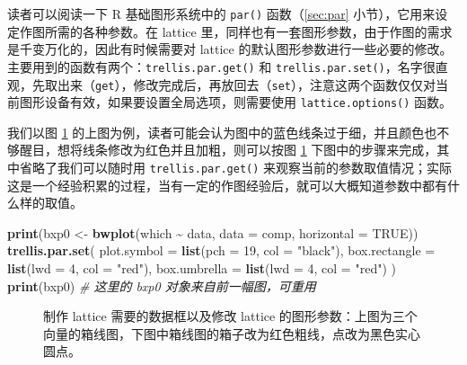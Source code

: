 \documentclass[
  b5paper,
  UTF8,twoside]{book}
\newenvironment{Shaded}{\begin{snugshade}}{\end{snugshade}}
\newcommand{\AttributeTok}[1]{\textcolor[rgb]{0.13,0.29,0.53}{#1}}
\newcommand{\CommentTok}[1]{\textcolor[rgb]{0.56,0.35,0.01}{\textit{#1}}}
\newcommand{\ConstantTok}[1]{\textcolor[rgb]{0.56,0.35,0.01}{#1}}
\newcommand{\DecValTok}[1]{\textcolor[rgb]{0.00,0.00,0.81}{#1}}
\newcommand{\FunctionTok}[1]{\textcolor[rgb]{0.13,0.29,0.53}{\textbf{#1}}}
\newcommand{\NormalTok}[1]{#1}
\newcommand{\OtherTok}[1]{\textcolor[rgb]{0.56,0.35,0.01}{#1}}
\newcommand{\SpecialCharTok}[1]{\textcolor[rgb]{0.81,0.36,0.00}{\textbf{#1}}}
\newcommand{\StringTok}[1]{\textcolor[rgb]{0.31,0.60,0.02}{#1}}
\begin{document}
读者可以阅读一下 R 基础图形系统中的 \texttt{par()} 函数（\ref{sec:par} 小节），它用来设定作图所需的各种参数。在 lattice 里，同样也有一套图形参数，由于作图的需求是千变万化的，因此有时候需要对 lattice 的默认图形参数进行一些必要的修改。主要用到的函数有两个：\texttt{trellis.par.get()} 和 \texttt{trellis.par.set()}，名字很直观，先取出来（\texttt{get}），修改完成后，再放回去（\texttt{set}），注意这两个函数仅仅对当前图形设备有效，如果要设置全局选项，则需要使用 \texttt{lattice.options()} 函数。

我们以图 \ref{fig:lattice-data-par} 的上图为例，读者可能会认为图中的蓝色线条过于细，并且颜色也不够醒目，想将线条修改为红色并且加粗，则可以按图 \ref{fig:lattice-data-par} 下图中的步骤来完成，其中省略了我们可以随时用 \texttt{trellis.par.get()} 来观察当前的参数取值情况；实际这是一个经验积累的过程，当有一定的作图经验后，就可以大概知道参数中都有什么样的取值。

\begin{Shaded}
\begin{Highlighting}[]
\FunctionTok{print}\NormalTok{(bxp0 }\OtherTok{\textless{}{-}} \FunctionTok{bwplot}\NormalTok{(which }\SpecialCharTok{\textasciitilde{}}\NormalTok{ data, }\AttributeTok{data =}\NormalTok{ comp, }\AttributeTok{horizontal =} \ConstantTok{TRUE}\NormalTok{))}
\FunctionTok{trellis.par.set}\NormalTok{(}
  \AttributeTok{plot.symbol =} \FunctionTok{list}\NormalTok{(}\AttributeTok{pch =} \DecValTok{19}\NormalTok{, }\AttributeTok{col =} \StringTok{"black"}\NormalTok{),}
  \AttributeTok{box.rectangle =} \FunctionTok{list}\NormalTok{(}\AttributeTok{lwd =} \DecValTok{4}\NormalTok{, }\AttributeTok{col =} \StringTok{"red"}\NormalTok{),}
  \AttributeTok{box.umbrella =} \FunctionTok{list}\NormalTok{(}\AttributeTok{lwd =} \DecValTok{4}\NormalTok{, }\AttributeTok{col =} \StringTok{"red"}\NormalTok{)}
\NormalTok{)}
\FunctionTok{print}\NormalTok{(bxp0) }\CommentTok{\# 这里的 bxp0 对象来自前一幅图，可重用}
\end{Highlighting}
\end{Shaded}

\begin{figure}

{\centering {}\newline{}\newline

}

\caption[制作 lattice 需要的数据框以及修改 lattice 的图形参数]{制作 lattice 需要的数据框以及修改 lattice 的图形参数：上图为三个向量的箱线图，下图中箱线图的箱子改为红色粗线，点改为黑色实心圆点。}\label{fig:lattice-data-par}
\end{figure}
\end{document}
